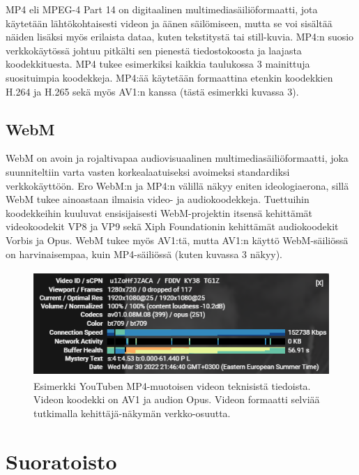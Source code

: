 \documentclass[finnish, 12pt, a4paper, elec, utf8, a-1b, online]{aaltothesis}
\begin{document}
MP4 eli MPEG-4 Part 14 on digitaalinen multimediasäiliöformaatti, jota käytetään lähtökohtaisesti videon ja äänen säilömiseen, mutta se voi sisältää näiden lisäksi myös erilaista dataa, kuten tekstitystä tai still-kuvia. MP4:n suosio verkkokäytössä johtuu pitkälti sen pienestä tiedostokoosta ja laajasta koodekkituesta. MP4 tukee esimerkiksi kaikkia taulukossa 3 mainittuja suosituimpia koodekkeja. MP4:ää käytetään formaattina etenkin koodekkien H.264 ja H.265 sekä myös AV1:n kanssa (tästä esimerkki kuvassa 3).

\subsection*{WebM}

WebM on avoin ja rojaltivapaa audiovisuaalinen multimediasäiliöformaatti, joka suunniteltiin varta vasten korkealaatuiseksi avoimeksi standardiksi verkkokäyttöön. \cite{WebM} Ero WebM:n ja MP4:n välillä näkyy eniten ideologiaerona, sillä WebM tukee ainoastaan ilmaisia video- ja audiokoodekkeja. Tuettuihin koodekkeihin kuuluvat ensisijaisesti WebM-projektin itsensä kehittämät videokoodekit VP8 ja VP9 sekä Xiph Foundationin kehittämät audiokoodekit Vorbis ja Opus. WebM tukee myös AV1:tä, mutta AV1:n käyttö WebM-säiliössä on harvinaisempaa, kuin MP4-säiliössä (kuten kuvassa 3 näkyy).

\begin{figure}[htb]
  \centering
  \includegraphics[height=4cm]{./img/youtube.png}
  \caption{Esimerkki YouTuben MP4-muotoisen videon teknisistä tiedoista. Videon koodekki on AV1 ja audion Opus. Videon formaatti selviää tutkimalla kehittäjä-näkymän verkko-osuutta. \label{kuva3}}
\end{figure}

\clearpage


\section{Suoratoisto}
\end{document}
